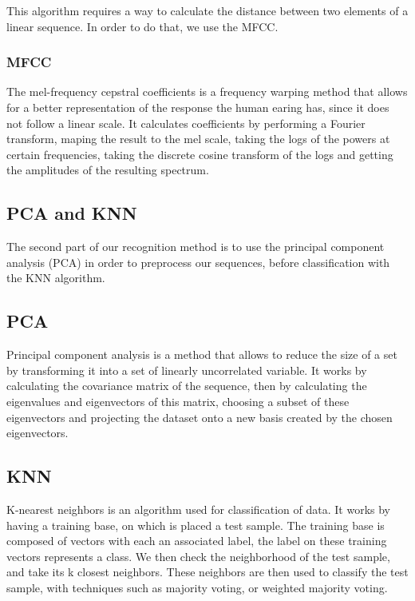 \documentclass[%
  report,%
  10pt,%
  a4paper,%
  fleqn,%
  oneside,%
  sumario = tradicional,%
  chapter = TITLE,%
  section = TITLE,%
]{abntex2}
\begin{document}
This algorithm requires a way to calculate the distance between two elements of a linear sequence.
In order to do that, we use the MFCC.

\subsubsection{MFCC}

The mel-frequency cepstral coefficients is a frequency warping method that allows for a better representation of the response the human earing has, since it does not follow a linear scale.
It calculates coefficients by performing a Fourier transform, maping the result to the mel scale, taking the logs of the powers at certain frequencies, taking the discrete cosine transform of the logs and getting the amplitudes of the resulting spectrum.

\subsection{PCA and KNN}

The second part of our recognition method is to use the principal component analysis (PCA) in order to preprocess our sequences, before classification with the KNN algorithm.

\subsection{PCA}

Principal component analysis is a method that allows to reduce the size of a set by transforming it into a set of linearly uncorrelated variable.
It works by calculating the covariance matrix of the sequence, then by calculating the eigenvalues and eigenvectors of this matrix, choosing a subset of these eigenvectors and projecting the dataset onto a new basis created by the chosen eigenvectors.

\subsection{KNN}

K-nearest neighbors is an algorithm used for classification of data.
It works by having a training base, on which is placed a test sample.
The training base is composed of vectors with each an associated label, the label on these training vectors represents a class.
We then check the neighborhood of the test sample, and take its k closest neighbors.
These neighbors are then used to classify the test sample, with techniques such as majority voting, or weighted majority voting.
\end{document}
